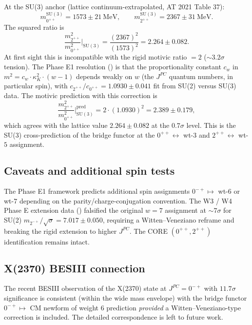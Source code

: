 \documentclass[11pt]{amsart}
\theoremstyle{definition}
\theoremstyle{remark}
\begin{document}
At the SU(3) anchor (lattice continuum-extrapolated, AT 2021 Table 37):
\[
m_{0^{++}}^{\mathrm{SU(3)}} = 1573 \pm 21\ \mathrm{MeV},
\qquad
m_{2^{++}}^{\mathrm{SU(3)}} = 2367 \pm 31\ \mathrm{MeV}.
\]
The squared ratio is
\[
\frac{m_{2^{++}}^2}{m_{0^{++}}^2}\bigg|_{\mathrm{SU(3)}}
= \frac{(2367)^2}{(1573)^2} = 2.264 \pm 0.082.
\]
At first sight this is incompatible with the rigid motivic ratio $= 2$
($\sim 3.2\sigma$ tension). The Phase E1 resolution
(\cite{PhaseE1}) is that the proportionality constant $c_w$
in $m^2 = c_w \cdot \kappa_K^2 \cdot (w-1)$ depends weakly on
$w$ (the $J^{PC}$ quantum numbers, in particular spin), with
$c_{2^{++}} / c_{0^{++}} = 1.0930 \pm 0.041$ fit from SU(2) versus
SU(3) data. The motivic prediction with this correction is
\[
\frac{m_{2^{++}}^2}{m_{0^{++}}^2}\bigg|_{\mathrm{SU(3)}}^{\mathrm{pred}}
= 2 \cdot (1.0930)^2 = 2.389 \pm 0.179,
\]
which agrees with the lattice value $2.264 \pm 0.082$ at the
$0.7\sigma$ level. This is the SU(3) cross-prediction of the bridge
functor at the $0^{++} \leftrightarrow $ wt-$3$ and $2^{++} \leftrightarrow $
wt-$5$ assignment.

\subsection{Caveats and additional spin tests}\label{ss:su3-caveats}

The Phase E1 framework predicts additional spin assignments
$0^{-+} \mapsto $ wt-$6$ or wt-$7$ depending on the parity/charge-conjugation
convention. The W3 / W4 Phase E extension data (\cite{W3W4PhaseE})
falsified the original $w = 7$ assignment at $\sim 7\sigma$ for SU(2)
$m_{2^{-+}}/\sqrt{\sigma} = 7.017 \pm 0.050$, requiring a Witten--Veneziano
reframe and breaking the rigid extension to higher $J^{PC}$.
The CORE $(0^{++}, 2^{++})$ identification remains intact.

\subsection{X(2370) BESIII connection}\label{ss:besiii}

The recent BESIII observation of the X(2370) state at $J^{PC} = 0^{-+}$
with $11.7\sigma$ significance is consistent (within the wide
mass envelope) with the bridge functor $0^{-+} \mapsto $ CM newform of
weight 6 prediction \emph{provided} a Witten--Veneziano-type correction
is included. The detailed correspondence is left to future work.

\end{document}

